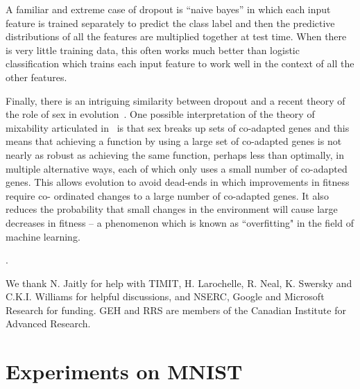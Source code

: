 \documentclass[12pt]{article}
\newcounter{lastnote}
\newenvironment{scilastnote}{%
\setcounter{lastnote}{\value{enumiv}}%
\addtocounter{lastnote}{+1}%
\begin{list}%
{\arabic{lastnote}.}
{\setlength{\leftmargin}{.22in}}
{\setlength{\labelsep}{.5em}}}
{\end{list}}
\begin{document}
A familiar and extreme case of dropout is ``naive bayes'' in which each input feature is
trained separately to predict the class label and then the predictive distributions of all
the features are multiplied together at test time. When there is very little training
data, this often works much better than logistic classification which trains each input
feature to work well in the context of all the other features.

Finally, there is an intriguing similarity between dropout and a recent theory
of the role of sex in evolution~\cite{Pap}.  One possible interpretation of the
theory of mixability articulated in~\cite{Pap} is that sex breaks up sets of
co-adapted genes and this means that achieving a function by using a large set
of co-adapted genes is not nearly as robust as achieving the same function,
perhaps less than optimally, in multiple alternative ways, each of which only
uses a small number of co-adapted genes. This allows evolution to avoid
dead-ends in which improvements in fitness require co- ordinated changes to a
large number of co-adapted genes. It also reduces the probability that small
changes in the environment will cause large decreases in fitness – a phenomenon
which is known as ``overfitting" in the field of machine learning.




\begin{scilastnote}
\item We thank N. Jaitly for help with TIMIT, H. Larochelle, R. Neal, K. Swersky and C.K.I. Williams for
helpful discussions, and NSERC, Google and Microsoft Research for
funding. GEH and RRS are members of the Canadian Institute for Advanced Research.
\end{scilastnote}
\appendix
\section{Experiments on MNIST}
\label{mnistsom}
\end{document}
